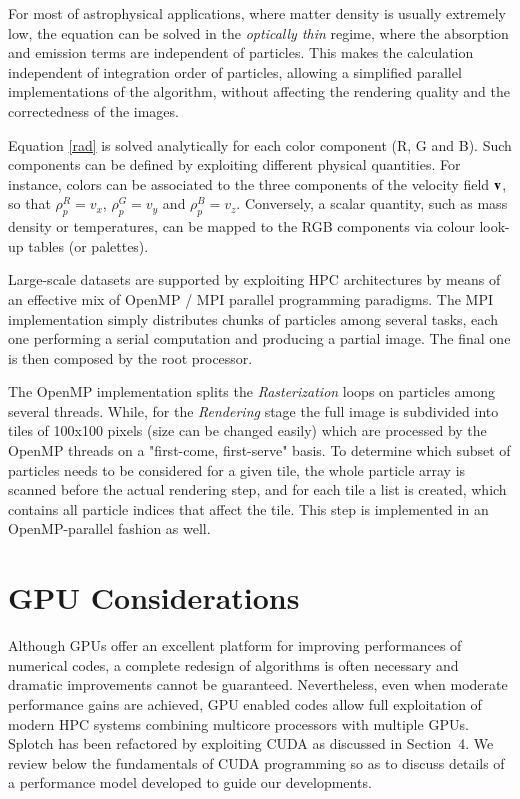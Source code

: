 \documentclass[1p]{elsarticle}
\begin{document}
\begin{itemize}
For most of astrophysical applications, where matter density is usually extremely low, the equation can be solved in the {\it optically thin} regime, where the absorption and emission terms are independent of particles. 
This makes the calculation independent of integration order of particles, allowing a simplified parallel implementations of the algorithm, without affecting the rendering quality and the correctedness of the images. 

Equation \eqref{rad} is solved analytically for each color component (R, G and B). Such components can be defined by exploiting different physical quantities. For instance, colors  can be associated to the three components of the velocity field $\bf v$, so that 
$\rho_p^{R}=v_x$, $\rho_p^{G}=v_y$ and $\rho_p^{B}=v_z$. Conversely, a scalar quantity, such as mass density or temperatures, can be mapped to the RGB components via colour look-up tables (or palettes). 
\end{itemize}
Large-scale datasets are supported by exploiting HPC architectures by means of an effective mix of OpenMP / MPI parallel programming paradigms. The MPI implementation \cite{jin:high-performance}  simply distributes chunks of particles among several tasks, each one performing a serial computation and producing a partial image. The final one is then composed by the root processor.  
 
The OpenMP implementation splits the {\it Rasterization} loops on particles among several threads. While, for the {\it Rendering} stage the full image is subdivided into tiles of 100x100 pixels (size can be changed easily) which are processed by the OpenMP threads on a "first-come, first-serve" basis. To determine which subset of particles needs to be considered for a given tile, the whole particle array is scanned before the actual rendering step, and for each tile a list is created, which contains all particle indices that affect the tile. This step is implemented in an OpenMP-parallel fashion as well.


\section{GPU Considerations}
\label{sec:gpu-code}
Although GPUs offer an excellent platform for improving performances of numerical codes, a complete redesign of algorithms is often necessary and dramatic improvements cannot be guaranteed. Nevertheless, even when moderate performance gains are achieved, GPU enabled codes allow full exploitation of modern HPC systems combining multicore processors with multiple GPUs. Splotch has been refactored by exploiting CUDA as discussed in Section~4. We review below the fundamentals of CUDA programming so as to discuss details of a performance model developed to guide our developments.
\end{document}
